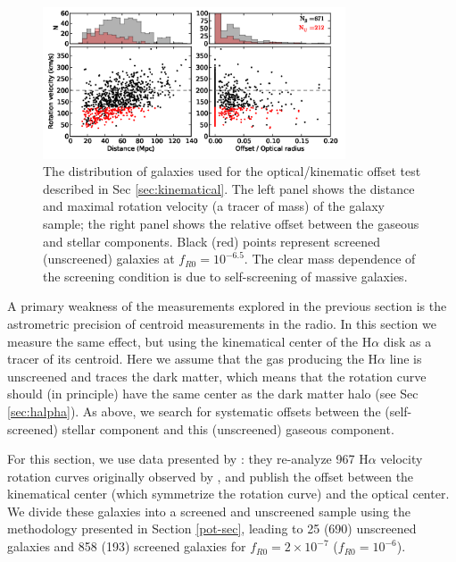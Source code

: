 \documentclass[useAMS,usenatbib,twocolumn]{mn2e}
\newcommand{\ha}{H$\alpha$}
\begin{document}
\begin{figure}
\begin{center}
  \includegraphics[width=0.8\textwidth]{figures/sec4_2_scatter.png}
  \caption{The distribution of galaxies used for the optical/kinematic offset
  test described in Sec
    \ref{sec:kinematical}.  The left panel shows the distance and maximal
    rotation velocity (a tracer of mass) of the galaxy sample; the right
    panel shows the relative offset between the gaseous and stellar components.
    Black (red) points represent screened (unscreened) galaxies at
    $f_{R0} = 10^{-6.5}$.  The clear mass dependence of the screening condition
    is due to self-screening of massive galaxies.}
  \label{offset-kin-den-1}
\end{center}
\end{figure}

A primary weakness of the measurements explored in the previous section is
the astrometric precision of centroid measurements in the radio.  In
this section we measure the same effect, but using the kinematical
center of the \ha{} disk as a tracer of its centroid.  Here we assume that
the gas producing the \ha{} line is unscreened and traces the dark matter,
which means that the rotation curve should (in principle) have the same
center as the dark matter halo (see Sec \ref{sec:halpha}).
As above, we search for systematic offsets
between the (self-screened) stellar component and this (unscreened) gaseous
component.

For this section, we use data presented by \citet{persic1995}:
they re-analyze 967 \ha{} velocity rotation curves originally 
observed by \citet{mat92}, and publish the offset between the kinematical
center (which symmetrize the rotation curve) and the optical center.  We divide these galaxies into a screened
and unscreened sample using the methodology presented in Section \ref{pot-sec},
leading to 25 (690) unscreened galaxies and 858 (193) screened galaxies
for $f_{R0} = 2 \times 10^{-7}$ ($f_{R0} = 10^{-6}$).
\end{document}
